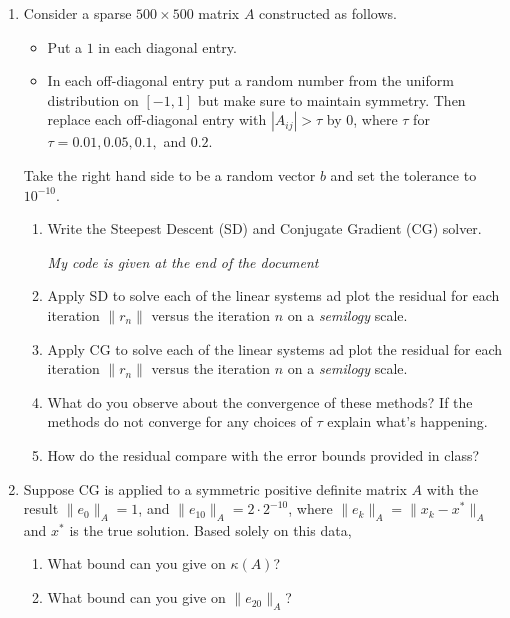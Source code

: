 \documentclass[a4paper,12pt]{article}
\newcommand{\abs}[1]{\left| #1 \right|}
\newcommand{\norm}[1]{\lVert #1 \rVert}
\begin{document}
\begin{enumerate}[label = \arabic*)]
	\item Consider a sparse $ 500 \times 500 $ matrix $ A $ constructed as follows.
	\begin{itemize}[topsep = 0pt]
		\item Put a $ 1 $ in each diagonal entry.
		\item In each off-diagonal entry put a random number from the uniform distribution on $ [-1,1] $ but make sure to maintain symmetry. Then replace each off-diagonal entry with $ \abs{A_{ij}} > \tau $ by $ 0 $, where $ \tau $ for $ \tau = 0.01, 0.05, 0.1, $ and $ 0.2 $.
	
	\end{itemize}
		
	Take the right hand side to be a random vector $ b $ and set the tolerance to $ 10^{-10} $.
	\begin{enumerate}[label = (\alph*)]
		\item Write the Steepest Descent (SD) and Conjugate Gradient (CG) solver.
		
		\emph{My code is given at the end of the document}
		
		\item Apply SD to solve each of the linear systems ad plot the residual for each iteration $ \norm{r_n} $ versus the iteration $ n $ on a \emph{semilogy} scale. 
		
		\item Apply CG to solve each of the linear systems ad plot the residual for each iteration $ \norm{r_n} $ versus the iteration $ n $ on a \emph{semilogy} scale. 
		
		\item What do you observe about the convergence of these methods? If the methods do not converge for any choices of $ \tau $ explain what's happening.
		
		\item How do the residual compare with the error bounds provided in class?
	\end{enumerate}

	\item Suppose CG is applied to a symmetric positive definite matrix $ A $ with the result $ \norm{e_0}_A = 1 $, and $ \norm{e_{10}}_A = 2 \cdot 2^{-10} $, where $ \norm{e_k}_A = \norm{x_k - x^*}_A $ and $ x^* $ is the true solution. Based solely on this data,
	\begin{enumerate}[label = (\alph*)]
		\item What bound can you give on $ \kappa(A) $?
		\item What bound can you give on $ \norm{e_{20}}_A $?
	\end{enumerate}


\end{enumerate}
\end{document}
